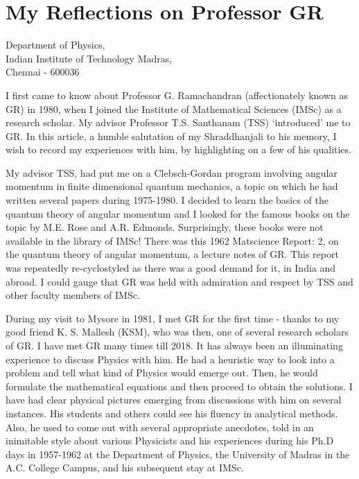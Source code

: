 \chapter[My Reflections on Professor GR]{My Reflections on Professor GR}\label{chap3}


\begin{center}
Department of Physics,\\
Indian Institute of Technology Madras,\\
Chennai - 600036
\end{center}

I first came to know about Professor G. Ramachandran (affectionately known as GR) in 1980, when I joined the Institute of Mathematical Sciences (IMSc) as a research scholar. My advisor Professor T.S. Santhanam (TSS) `introduced' me to GR. In this article, a humble salutation of my Shraddhanjali to his memory, I wish to record my experiences with him, by highlighting on a few of his qualities.

My advisor TSS, had put me on a Clebsch-Gordan program involving angular momentum in finite dimensional quantum mechanics, a topic on which he had written several papers during 1975-1980. I decided to learn the basics of the quantum theory of angular momentum and I looked for the famous books on the topic by M.E. Rose and A.R. Edmonds. Surprisingly, these books were not available in the library of IMSc! There was this 1962 Matscience Report: 2, on the quantum theory of angular momentum, a lecture notes of GR. This report was repeatedly re-cyclostyled as there was a good demand for it, in India and abroad. I could gauge that GR was held with admiration and respect by TSS and other faculty members of IMSc.

During my visit to Mysore in 1981, I met GR for the first time - thanks to my good friend K. S. Mallesh (KSM), who was then, one of several research scholars of GR. I have met GR many times till 2018. It has always been an illuminating experience to discuss Physics with him. He had a heuristic way to look into a problem and tell what kind of Physics would emerge out. Then, he would formulate the mathematical equations and then proceed to obtain the solutions. I have had clear physical pictures emerging from discussions with him on several instances. His students and others could see his fluency in analytical methods. Also, he used to come out with several appropriate anecdotes, told in an inimitable style about various Physicists and his experiences during his Ph.D days in 1957-1962 at the Department of Physics, the University of Madras in the A.C. College Campus, and his subsequent stay at IMSc.

